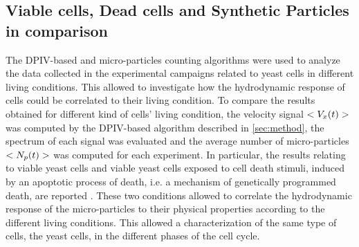 \documentclass[journal]{IEEEtran}
\theoremstyle{definition}
\theoremstyle{remark}
\begin{document}
\subsection{Viable cells, Dead cells and Synthetic Particles in comparison}\label{sec:comparison}

The DPIV-based and micro-particles counting algorithms were used to analyze the data collected in the experimental campaigns related to yeast cells in different living conditions. This allowed to investigate how the hydrodynamic response of cells could be correlated to their living condition.  To compare the results obtained for different kind of cells' living condition, the velocity signal $<V_{x}(t)>$ was computed by the DPIV-based algorithm described in \sect\ref{sec:method}, the spectrum of each signal was evaluated and the average number of micro-particles $<N_p(t)>$ was computed for each experiment. 
In particular, the results relating to viable yeast cells and viable yeast cells exposed to cell death stimuli, induced by an apoptotic process of death, i.e. a mechanism of genetically programmed death, are reported . These two conditions allowed to correlate the hydrodynamic response of the micro-particles to their physical properties according to the different living conditions. This allowed a characterization of the same type of cells, the yeast cells, in the different phases of the cell cycle.
\end{document}
